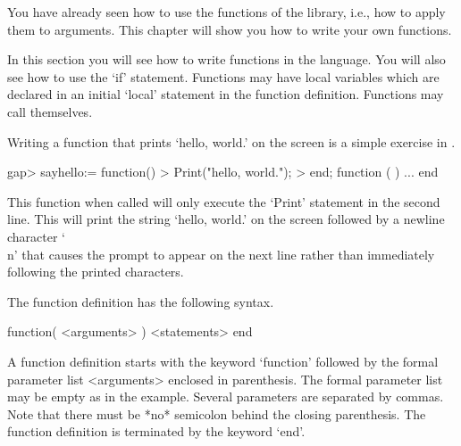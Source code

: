 


You have  already seen how to  use the functions   of the {\GAP} library,
i.e., how to apply them to arguments.  This chapter  will show you how to
write your own functions.

In  this section  you will  see  how  to write  functions  in the  {\GAP}
language.  You will also see  how to use  the `if' statement.   Functions
may  have  local variables   which are  declared   in an  initial `local'
statement in the function definition.  Functions may call themselves.


Writing a function that prints `hello, world.'  on the screen is a simple
exercise in {\GAP}.

\beginexample
    gap> sayhello:= function()
    > Print("hello, world.\n");
    > end;
    function (  ) ... end
\endexample

This function when called will only execute the  `Print' statement in the
second line.  This will  print the string  `hello, world.'  on the screen
followed by a  newline character `\\n' that causes  the {\GAP} prompt  to
appear  on the next  line rather  than  immediately following the printed
characters.

The function definition has the following syntax.

\)\fmark function( <arguments> ) <statements> end

A function definition starts with the keyword `function' followed  by the
formal  parameter list <arguments> enclosed  in  parenthesis.  The formal
parameter list  may be empty as in  the example.  Several  parameters are
separated by commas.  Note that there  must be  *no* semicolon behind the
closing   parenthesis.   The  function  definition  is  terminated by the
keyword `end'.

